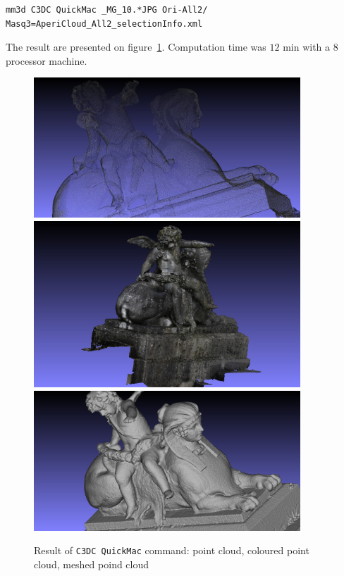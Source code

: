 \begin{verbatim}
mm3d C3DC QuickMac _MG_10.*JPG Ori-All2/ Masq3=AperiCloud_All2_selectionInfo.xml
\end{verbatim}


The result are presented on figure~\ref{FIG:Angel:Result}. Computation time was $12$ min with a $8$ processor machine.




\begin{figure}[H]
\begin{center}
\includegraphics[width=100mm]{FIGS/Ange/snapshot00.jpg}
\includegraphics[width=100mm]{FIGS/Ange/snapshot01.jpg}
\includegraphics[width=100mm]{FIGS/Ange/snapshot201.jpg}
\end{center}
\caption{Result of {\tt C3DC QuickMac} command: point cloud, coloured point cloud, meshed poind cloud}
\label{FIG:Angel:Result}
\end{figure}

